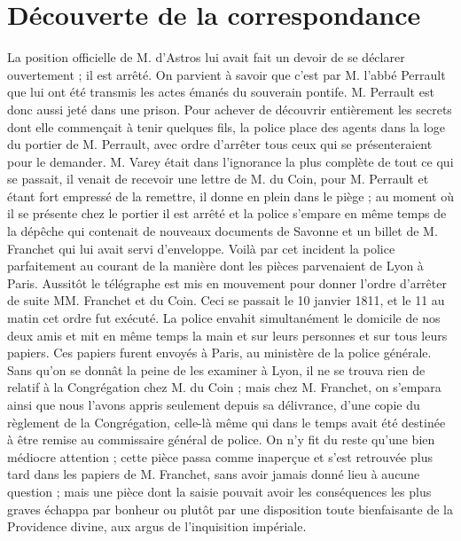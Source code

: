 \section*{Découverte de la correspondance}
La position officielle de M. d'Astros lui avait fait un devoir de se déclarer ouvertement ; il est arrêté. On parvient à savoir que c'est par M. l'abbé Perrault que lui ont été transmis les actes émanés du souverain pontife. M. Perrault est donc aussi jeté dans une prison. Pour achever de découvrir entièrement les secrets dont elle commençait à tenir quelques fils, la police place des agents dans la loge du portier de M. Perrault, avec ordre d'arrêter tous ceux qui se présenteraient pour le demander. M. Varey était dans l'ignorance la plus
complète de tout ce qui se passait, il venait de recevoir une lettre de M. du Coin, pour M. Perrault et étant fort empressé de la remettre, il donne en plein dans le piège ; au moment où il se présente chez le portier il est arrêté et la police s'empare en même temps de la dépêche qui contenait de nouveaux documents de Savonne et un billet de M. Franchet qui lui avait servi d'enveloppe. Voilà par cet incident la police parfaitement au courant de la manière dont les pièces parvenaient de Lyon à Paris. Aussitôt le télégraphe est mis en mouvement pour donner l'ordre d'arrêter de suite MM. Franchet et du Coin. Ceci se passait le 10 janvier 1811, et le 11 au matin cet ordre fut exécuté. La police envahit simultanément le domicile de nos deux amis et mit en même temps la main et sur leurs personnes et sur tous leurs papiers. Ces papiers furent envoyés à Paris, au ministère de la police générale. Sans qu'on se donnât la peine de les examiner à Lyon, il ne se trouva rien de relatif à la Congrégation chez M. du Coin ; mais chez M. Franchet, on s'empara ainsi que nous l'avons appris seulement depuis sa délivrance, d'une copie du règlement de la Congrégation, celle-là même qui dans le temps avait été destinée à être remise au commissaire général de police. On n'y fit du reste qu'une bien médiocre attention ; cette pièce passa comme inaperçue et s'est retrouvée plus tard dans les papiers de M. Franchet, sans avoir jamais donné lieu à aucune question ; mais une pièce dont la saisie pouvait avoir les conséquences les plus graves échappa par bonheur ou plutôt par une disposition toute bienfaisante de la Providence divine, aux argus de l'inquisition impériale.

